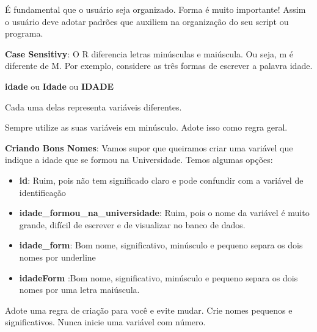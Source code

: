 \documentclass[
  letterpaper,
  DIV=11,
  numbers=noendperiod]{scrreprt}
\providecommand{\tightlist}{%
  \setlength{\itemsep}{0pt}\setlength{\parskip}{0pt}}
\begin{document}
É fundamental que o usuário seja organizado. Forma é muito importante!
Assim o usuário deve adotar padrões que auxiliem na organização do seu
script ou programa.

\textbf{Case Sensitivy}: O R diferencia letras minúsculas e maiúscula.
Ou seja, m é diferente de M. Por exemplo, considere as três formas de
escrever a palavra idade.

\textbf{idade} ou \textbf{Idade} ou \textbf{IDADE}

Cada uma delas representa variáveis diferentes.

\begin{tcolorbox}[enhanced jigsaw, titlerule=0mm, colback=white, coltitle=black, opacityback=0, breakable, colbacktitle=quarto-callout-tip-color!10!white, toprule=.15mm, colframe=quarto-callout-tip-color-frame, toptitle=1mm, bottomtitle=1mm, opacitybacktitle=0.6, left=2mm, arc=.35mm, rightrule=.15mm, bottomrule=.15mm, leftrule=.75mm, title=\textcolor{quarto-callout-tip-color}{\faLightbulb}\hspace{0.5em}{DICA}]

Sempre utilize as suas variáveis em minúsculo. Adote isso como regra
geral.

\end{tcolorbox}

\textbf{Criando Bons Nomes}: Vamos supor que queiramos criar uma
variável que indique a idade que se formou na Universidade. Temos
algumas opções:

\begin{itemize}
\tightlist
\item
  \textbf{id}: Ruim, pois não tem significado claro e pode confundir com
  a variável de identificação
\item
  \textbf{idade\_formou\_na\_universidade}: Ruim, pois o nome da
  variável é muito grande, difícil de escrever e de visualizar no banco
  de dados.
\item
  \textbf{idade\_form}: Bom nome, significativo, minúsculo e pequeno
  separa os dois nomes por underline
\item
  \textbf{idadeForm} :Bom nome, significativo, minúsculo e pequeno
  separa os dois nomes por uma letra maiúscula.
\end{itemize}

\begin{tcolorbox}[enhanced jigsaw, titlerule=0mm, colback=white, coltitle=black, opacityback=0, breakable, colbacktitle=quarto-callout-tip-color!10!white, toprule=.15mm, colframe=quarto-callout-tip-color-frame, toptitle=1mm, bottomtitle=1mm, opacitybacktitle=0.6, left=2mm, arc=.35mm, rightrule=.15mm, bottomrule=.15mm, leftrule=.75mm, title=\textcolor{quarto-callout-tip-color}{\faLightbulb}\hspace{0.5em}{DICA}]

Adote uma regra de criação para você e evite mudar. Crie nomes pequenos
e significativos. Nunca inicie uma variável com número.

\end{tcolorbox}
\end{document}

